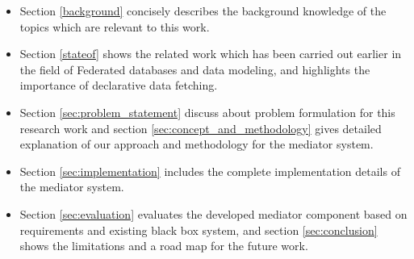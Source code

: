 		\begin{itemize}
			\item Section \ref{background} concisely describes the background knowledge of the topics which are relevant to this work.
			\item Section \ref{stateof} shows the related work which has been carried out earlier in the field of Federated databases and data modeling, and highlights the importance of declarative data fetching.
			\item Section \ref{sec:problem_statement} discuss about problem formulation for this research work and section \ref{sec:concept_and_methodology} gives detailed explanation of our approach and methodology for the mediator system.
			\item Section \ref{sec:implementation} includes the complete implementation details of the mediator system.
			\item Section \ref{sec:evaluation} evaluates the developed mediator component based on requirements and existing black box system, and section \ref{sec:conclusion} shows the limitations and a road map for the future work. 
		\end{itemize}

\let\cleardoublepage\clearpage

